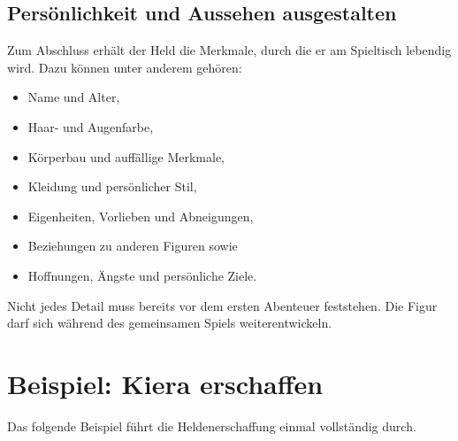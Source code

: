 \subsection{Persönlichkeit und Aussehen ausgestalten}

Zum Abschluss erhält der Held die Merkmale, durch die er am Spieltisch lebendig wird. Dazu können unter anderem gehören:

\begin{itemize}
  \item Name und Alter,
  \item Haar- und Augenfarbe,
  \item Körperbau und auffällige Merkmale,
  \item Kleidung und persönlicher Stil,
  \item Eigenheiten, Vorlieben und Abneigungen,
  \item Beziehungen zu anderen Figuren sowie
  \item Hoffnungen, Ängste und persönliche Ziele.
\end{itemize}

Nicht jedes Detail muss bereits vor dem ersten Abenteuer feststehen. Die Figur darf sich während des gemeinsamen Spiels weiterentwickeln.

\section{Beispiel: Kiera erschaffen}

Das folgende Beispiel führt die Heldenerschaffung einmal vollständig durch.

